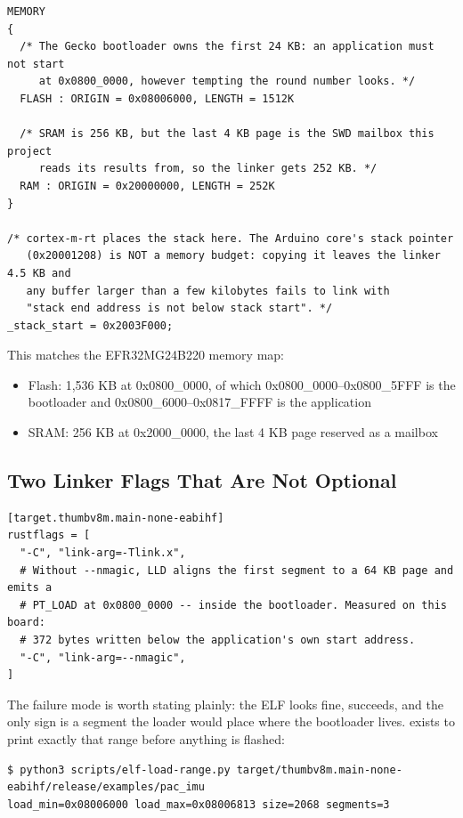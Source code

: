 \begin{verbatim}
MEMORY
{
  /* The Gecko bootloader owns the first 24 KB: an application must not start
     at 0x0800_0000, however tempting the round number looks. */
  FLASH : ORIGIN = 0x08006000, LENGTH = 1512K

  /* SRAM is 256 KB, but the last 4 KB page is the SWD mailbox this project
     reads its results from, so the linker gets 252 KB. */
  RAM : ORIGIN = 0x20000000, LENGTH = 252K
}

/* cortex-m-rt places the stack here. The Arduino core's stack pointer
   (0x20001208) is NOT a memory budget: copying it leaves the linker 4.5 KB and
   any buffer larger than a few kilobytes fails to link with
   "stack end address is not below stack start". */
_stack_start = 0x2003F000;
\end{verbatim}

This matches the EFR32MG24B220 memory map:
\begin{itemize}
    \item Flash: 1,536 KB at 0x0800\_0000, of which 0x0800\_0000--0x0800\_5FFF is the
          bootloader and 0x0800\_6000--0x0817\_FFFF is the application
    \item SRAM: 256 KB at 0x2000\_0000, the last 4 KB page reserved as a mailbox
\end{itemize}

\subsection{Two Linker Flags That Are Not Optional}
\label{sec:linker-flags}

\begin{verbatim}
[target.thumbv8m.main-none-eabihf]
rustflags = [
  "-C", "link-arg=-Tlink.x",
  # Without --nmagic, LLD aligns the first segment to a 64 KB page and emits a
  # PT_LOAD at 0x0800_0000 -- inside the bootloader. Measured on this board:
  # 372 bytes written below the application's own start address.
  "-C", "link-arg=--nmagic",
]
\end{verbatim}

The failure mode is worth stating plainly: the ELF looks fine, 
succeeds, and the only sign is a segment the loader would place where the bootloader
lives.  exists to print exactly that range before
anything is flashed:

\begin{verbatim}
$ python3 scripts/elf-load-range.py target/thumbv8m.main-none-eabihf/release/examples/pac_imu
load_min=0x08006000 load_max=0x08006813 size=2068 segments=3
\end{verbatim}

